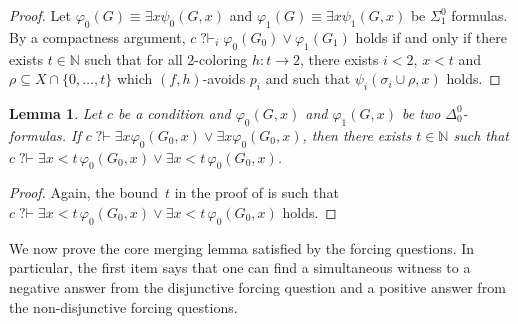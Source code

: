 \documentclass{article}
\newcommand{\qvdash}{\operatorname{{?}{\vdash}}}
\newcommand{\nqvdash}{\operatorname{{?}{\nvdash}}}
\newcommand{\WKL}[0]{\mathsf{WKL}}
\newcommand{\NN}[0]{\mathbb{N}}
\def\qt#1{``#1''}%
\def\NN{\mathbb{N}}
\def\qt#1{``#1''}%
\numberwithin{theorem}{section}
\newtheorem{lemma}[theorem]{Lemma}
\theoremstyle{definition}
\begin{document}

\begin{proof}
   Let $\varphi_0(G) \equiv \exists x \psi_0(G, x)$ and $\varphi_1(G) \equiv \exists x \psi_1(G, x)$ be $\Sigma_1^0$ formulas. By a compactness argument, $ c \qvdash_i \varphi_0(G_0) \lor \varphi_1(G_1)$ holds if and only if there exists $t \in \NN$ such that for all 2-coloring $h : t \to 2$, there exists $i<2$, $x < t$ and $\rho \subseteq X \cap \{0, \dots, t \}$ which $(f,h)$-avoids $p_i$ and such that $\psi_i(\sigma_i \cup \rho, x)$ holds.
\end{proof}

\begin{lemma}
    Let $c$ be a condition and $\varphi_0(G,x)$ and $\varphi_1(G,x)$ be two $\Delta^0_0$-formulas. If $c \qvdash \exists x \varphi_0(G_0,x) \lor \exists x \varphi_0(G_0,x)$, then there exists $t \in \NN$ such that $c \qvdash \exists x<t \,\varphi_0(G_0,x) \lor \exists x<t \, \varphi_0(G_0,x)$.
\end{lemma}


\begin{proof}
Again, the bound~$t$ in the proof of  is such that $c \qvdash \exists x<t \,\varphi_0(G_0,x) \lor \exists x<t \, \varphi_0(G_0,x)$ holds. %
\end{proof}

We now prove the core merging lemma satisfied by the forcing questions. In particular, the first item says that one can find a simultaneous witness to a negative answer from the disjunctive forcing question and a positive answer from the non-disjunctive forcing questions.
\end{document}

